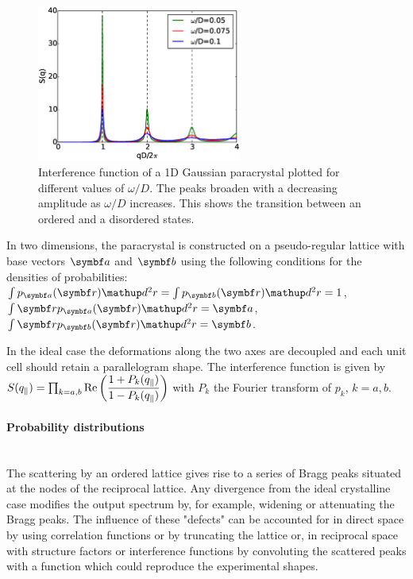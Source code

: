 \begin{figure}[tb]
\begin{center}
\includegraphics[width=0.6\textwidth]{fig/funcplot/S_q_1Dparacrystal.eps}
\end{center}
\caption{Interference function of a 1D Gaussian paracrystal plotted for different values of $\omega /D$. The peaks broaden with a decreasing amplitude as $\omega/D$ increases. This shows the transition between an ordered and a disordered states. }
\label{fig:1dparas_q}
\end{figure}

In two dimensions, the paracrystal is constructed on a pseudo-regular lattice with base vectors $\v{a}$ and $\v{b}$ using the following conditions for the densities of probabilities:\\
$\int p_{\v{a}}(\r)\d^2r=\int p_{\v{b}}(\r)\d^2r=1$,
$\int \r p_{\v{a}}(\r)\d^2r=\v{a}$,
$\int \r p_{\v{b}}(\r)\d^2r=\v{b}$.

In the ideal case the deformations along the two axes are decoupled
and each unit cell should retain a parallelogram shape.
The interference function is given by
$S(q_{\parallel})=\prod_{k=a,b}\operatorname{Re}\left(\dfrac{1+P_k(q_{\parallel})}{1-P_k(q_{\parallel})} \right)$
with $P_k$ the Fourier transform of $p_k$, $k=a, b$.

\paragraph{Probability distributions} \mbox{}\\
The scattering by an ordered lattice gives rise to a series of Bragg peaks situated at the nodes of the reciprocal lattice. Any divergence from the ideal crystalline case modifies the output spectrum by, for example, widening or attenuating the Bragg peaks. The influence of these "defects" can be accounted for
 in direct space by using correlation functions or by truncating the lattice or, in reciprocal space with structure factors or interference functions by convoluting the scattered peaks with a function which could reproduce the experimental shapes.

